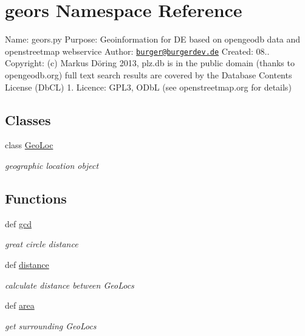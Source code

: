 \hypertarget{namespacegeors}{\section{geors Namespace Reference}
\label{namespacegeors}
}


Name\-: geors.\-py Purpose\-: Geoinformation for D\-E based on opengeodb data and openstreetmap webservice Author\-: \href{mailto:burger@burgerdev.de}{\tt burger@burgerdev.\-de} Created\-: 08.. Copyright\-: (c) Markus Döring 2013, plz.\-db is in the public domain (thanks to opengeodb.\-org) full text search results are covered by the Database Contents License (Db\-C\-L) 1. Licence\-: G\-P\-L3, O\-Db\-L (see openstreetmap.\-org for details)  


\subsection*{Classes}
\begin{DoxyCompactItemize}
\item 
class \hyperlink{classgeors_1_1GeoLoc}{Geo\-Loc}
\begin{DoxyCompactList}\small\item\em geographic location object \end{DoxyCompactList}\end{DoxyCompactItemize}
\subsection*{Functions}
\begin{DoxyCompactItemize}
\item 
def \hyperlink{namespacegeors_a524e72573297cfd02214f0ee5c416330}{gcd}
\begin{DoxyCompactList}\small\item\em great circle distance \end{DoxyCompactList}\item 
def \hyperlink{namespacegeors_a250a82f910c096532544fbe6b5a3f808}{distance}
\begin{DoxyCompactList}\small\item\em calculate distance between Geo\-Locs \end{DoxyCompactList}\item 
def \hyperlink{namespacegeors_abf605583f4b44d3ade8ac9a0a9da63d1}{area}
\begin{DoxyCompactList}\small\item\em get surrounding Geo\-Locs \end{DoxyCompactList}\end{DoxyCompactItemize}
